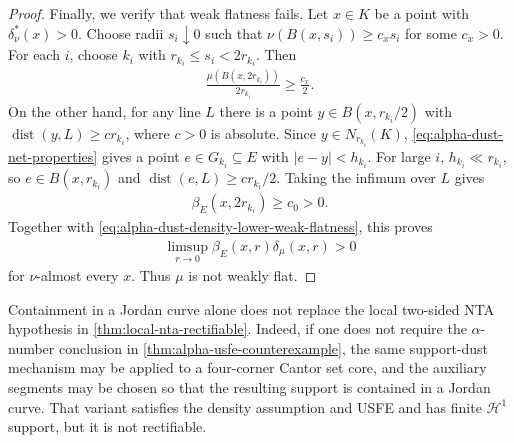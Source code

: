 \documentclass[11pt,a4paper,english,reqno]{amsart}
\newcommand{\hd}[1]{\mathcal{H}^{#1}}
\numberwithin{equation}{section}
\renewcommand{\subset}{\subseteq}
\DeclareMathOperator{\dist}{dist}
\numberwithin{definition}{section}
\begin{document}
\begin{proof}
  Finally, we verify that weak flatness fails.  Let $x\in K$ be a point with $\delta_\nu^*(x)>0$.  Choose radii $s_i\downarrow0$ such that $\nu(B(x,s_i))\ge c_xs_i$ for some $c_x>0$.  For each $i$, choose $k_i$ with $r_{k_i}\le s_i<2r_{k_i}$.  Then
  \begin{align}\label{eq:alpha-dust-density-lower-weak-flatness}
    \frac{\mu(B(x,2r_{k_i}))}{2r_{k_i}}
    \ge \frac{c_x}{2} .
  \end{align}
  On the other hand, for any line $L$ there is a point $y\in B(x,r_{k_i}/2)$ with $\dist(y,L)\ge c r_{k_i}$, where $c>0$ is absolute.  Since $y\in N_{r_{k_i}}(K)$, \cref{eq:alpha-dust-net-properties} gives a point $e\in G_{k_i}\subset E$ with $|e-y|<h_{k_i}$.  For large $i$, $h_{k_i}\ll r_{k_i}$, so $e\in B(x,r_{k_i})$ and $\dist(e,L)\ge c r_{k_i}/2$.  Taking the infimum over $L$ gives
  \begin{align}
    \beta_E(x,2r_{k_i})\ge c_0>0 .
  \end{align}
  Together with \cref{eq:alpha-dust-density-lower-weak-flatness}, this proves
  \begin{align}
    \limsup_{r\to0}\beta_E(x,r)\delta_\mu(x,r)>0
  \end{align}
  for $\nu$-almost every $x$.  Thus $\mu$ is not weakly flat.
\end{proof}

\begin{rem}\label{rem:jordan-curve-version}
  Containment in a Jordan curve alone does not replace the local two-sided NTA hypothesis in \cref{thm:local-nta-rectifiable}.
  Indeed, if one does not require the $\alpha$-number conclusion in \cref{thm:alpha-usfe-counterexample}, the same support-dust mechanism may be applied to a four-corner Cantor set core, and the auxiliary segments may be chosen so that the resulting support is contained in a Jordan curve.
  That variant satisfies the density assumption and USFE and has finite $\hd1$ support, but it is not rectifiable.
\end{rem}


\printbibliography
\end{document}
